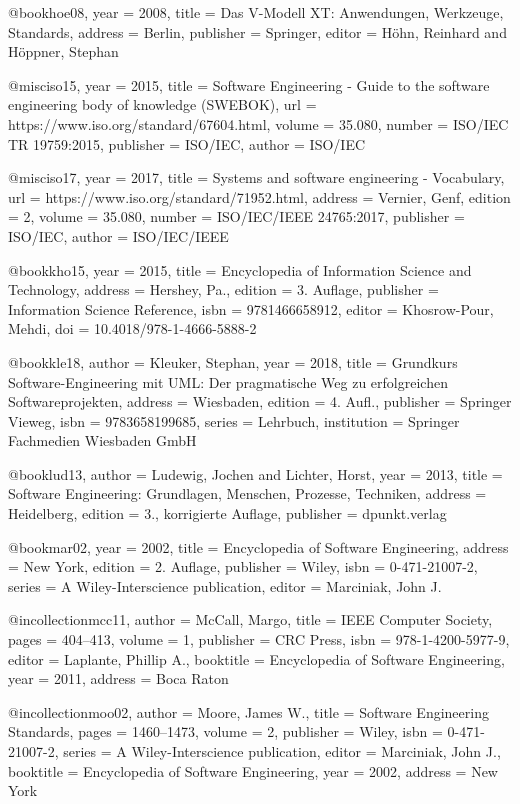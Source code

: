 @book{hoe08,
 year = {2008},
 title = {Das V-Modell XT: Anwendungen, Werkzeuge, Standards},
 address = {Berlin},
 publisher = {Springer},
 editor = {H{\"o}hn, Reinhard and H{\"o}ppner, Stephan}
}


@misc{iso15,
 year = {2015},
 title = {Software Engineering - Guide to the software engineering body of knowledge (SWEBOK)},
 url = {https://www.iso.org/standard/67604.html},
 volume = {35.080},
 number = {ISO/IEC TR 19759:2015},
 publisher = {ISO/IEC},
 author = {ISO/IEC}
}


@misc{iso17,
 year = {2017},
 title = {Systems and software engineering - Vocabulary},
 url = {https://www.iso.org/standard/71952.html},
 address = {Vernier, Genf},
 edition = {2},
 volume = {35.080},
 number = {ISO/IEC/IEEE 24765:2017},
 publisher = {ISO/IEC},
 author = {ISO/IEC/IEEE}
}


@book{kho15,
 year = {2015},
 title = {Encyclopedia of Information Science and Technology},
 address = {Hershey, Pa.},
 edition = {3. Auflage},
 publisher = {{Information Science Reference}},
 isbn = {9781466658912},
 editor = {Khosrow-Pour, Mehdi},
 doi = {10.4018/978-1-4666-5888-2}
}


@book{kle18,
 author = {Kleuker, Stephan},
 year = {2018},
 title = {Grundkurs Software-Engineering mit UML: Der pragmatische Weg zu erfolgreichen Softwareprojekten},
 address = {Wiesbaden},
 edition = {4. Aufl.},
 publisher = {{Springer Vieweg}},
 isbn = {9783658199685},
 series = {Lehrbuch},
 institution = {{Springer Fachmedien Wiesbaden GmbH}}
}


@book{lud13,
 author = {Ludewig, Jochen and Lichter, Horst},
 year = {2013},
 title = {Software Engineering: Grundlagen, Menschen, Prozesse, Techniken},
 address = {Heidelberg},
 edition = {3., korrigierte Auflage},
 publisher = {dpunkt.verlag}
}


@book{mar02,
 year = {2002},
 title = {Encyclopedia of Software Engineering},
 address = {New York},
 edition = {2. Auflage},
 publisher = {Wiley},
 isbn = {0-471-21007-2},
 series = {A Wiley-Interscience publication},
 editor = {Marciniak, John J.}
}


@incollection{mcc11,
 author = {McCall, Margo},
 title = {IEEE Computer Society},
 pages = {404--413},
 volume = {1},
 publisher = {{CRC Press}},
 isbn = {978-1-4200-5977-9},
 editor = {Laplante, Phillip A.},
 booktitle = {Encyclopedia of Software Engineering},
 year = {2011},
 address = {Boca Raton}
}


@incollection{moo02,
 author = {Moore, James W.},
 title = {Software Engineering Standards},
 pages = {1460--1473},
 volume = {2},
 publisher = {Wiley},
 isbn = {0-471-21007-2},
 series = {A Wiley-Interscience publication},
 editor = {Marciniak, John J.},
 booktitle = {Encyclopedia of Software Engineering},
 year = {2002},
 address = {New York}
}


